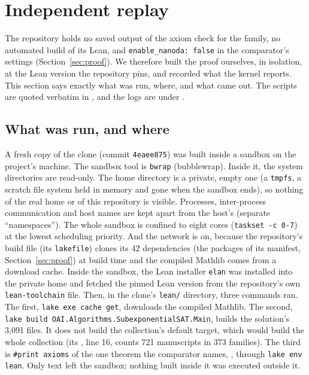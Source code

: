 \section{Independent replay}
\label{sec:replay}
\begingroup\sloppy

The repository holds no saved output of the axiom check for the family,
no automated build of its Lean, and \texttt{enable\_nanoda: false} in the
comparator's settings (Section~\ref{sec:proof}). We therefore built the
proof ourselves, in isolation, at the Lean version the repository pins,
and recorded what the kernel reports. This section says exactly what was
run, where, and what came out. The scripts are quoted verbatim in
, and the logs are under
.

\subsection{What was run, and where}

A fresh copy of the clone (commit \texttt{4eaee875}) was built inside a
sandbox on the project's machine. The sandbox tool is \texttt{bwrap}
(bubblewrap). Inside it, the system directories are read-only. The home
directory is a private, empty one (a \texttt{tmpfs}, a scratch file
system held in memory and gone when the sandbox ends), so nothing of the
real home or of this repository is visible. Processes, inter-process
communication and host names are kept apart from the host's (separate
``namespaces''). The whole sandbox is confined to eight cores
(\texttt{taskset -c 0-7}) at the lowest scheduling priority. And the
network is on, because the repository's build file
(its \texttt{lakefile}) clones its 42 dependencies (the packages of its manifest, Section~\ref{sec:proof}) at build time and the compiled Mathlib comes
from a download cache. Inside the sandbox, the Lean installer
\texttt{elan} was installed into the private home and fetched the
pinned Lean version from the repository's own \texttt{lean-toolchain}
file. Then, in the clone's \texttt{lean/} directory, three commands
ran. The first, \texttt{lake exe cache get}, downloads the compiled Mathlib.
The second, \texttt{lake build OAI.Algorithms.SubexponentialSAT.Main}, builds
the solution's 3,091 files. It does not build the collection's default target,
which would build the whole collection (its , line 16, counts 721 manuscripts in 373 families). The third is \texttt{\#print axioms} of the
one theorem the comparator names,
,
through \texttt{lake env lean}. Only text left the sandbox; nothing
built inside it was executed outside it.

